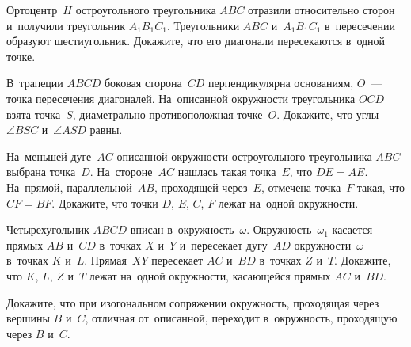 \begin{problems}
\item
Ортоцентр~$H$ остроугольного треугольника $ABC$ отразили относительно сторон
и~получили треугольник $A_1 B_1 C_1$.
Треугольники $ABC$ и~$A_1 B_1 C_1$ в~пересечении образуют шестиугольник.
Докажите, что его диагонали пересекаются в~одной точке.

\item
В~трапеции $ABCD$ боковая сторона~$CD$ перпендикулярна основаниям,
$O$~--- точка пересечения диагоналей.
На~описанной окружности треугольника $OCD$ взята точка~$S$, диаметрально
противоположная точке~$O$.
Докажите, что углы $\angle BSC$ и~$\angle ASD$ равны.

\item
На~меньшей дуге~$AC$ описанной окружности остроугольного треугольника $ABC$
выбрана точка~$D$.
На~стороне~$AC$ нашлась такая точка~$E$, что $DE = AE$.
На~прямой, параллельной~$AB$, проходящей через~$E$, отмечена точка~$F$ такая,
что $CF = BF$.
Докажите, что точки $D$, $E$, $C$, $F$ лежат на~одной окружности.

\item
Четырехугольник $ABCD$ вписан в~окружность~$\omega$.
Окружность~$\omega_1$ касается прямых $AB$ и~$CD$ в~точках $X$ и~$Y$
и~пересекает дугу~$AD$ окружности~$\omega$ в~точках $K$ и~$L$.
Прямая~$XY$ пересекает $AC$ и~$BD$ в~точках $Z$ и~$T$.
Докажите, что $K$, $L$, $Z$ и~$T$ лежат на~одной окружности, касающейся
прямых $AC$ и~$BD$.

\item
Докажите, что при изогональном сопряжении окружность, проходящая через
вершины $B$ и~$C$, отличная от~описанной, переходит в~окружность, проходящую
через $B$ и~$C$.

\end{problems}

